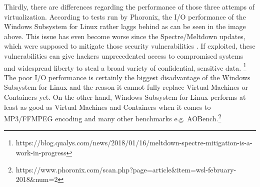 \documentclass[utf8,biblatex]{lni}
\begin{document}
Thirdly, there are differences regarding the performance of those three attemps of virtualization. According to tests run by Phoronix, the I/O performance of the Windows Subsystem for Linux rather laggs behind as can be seen in the image above. This issue has even become worse since the Spectre/Meltdown updates, which were supposed to mitigate those security vulnerabilities . \glqq If exploited, these vulnerabilities can give hackers unprecedented access to compromised systems and widespread liberty to steal a broad variety of confidential, sensitive data. \glqq \footnote{https://blog.qualys.com/news/2018/01/16/meltdown-spectre-mitigation-is-a-work-in-progress} The poor I/O performance is certainly the biggest disadvantage of the Windows Subsystem for Linux and the reason it cannot fully replace Virtual Machines or Containers yet. On the other hand, Windows Subsystem for Linux performs at least as good as Virtual Machines and Containers when it comes to MP3/FFMPEG encoding and many other benchmarks e.g. AOBench.\footnote{https://www.phoronix.com/scan.php?page=article&item=wsl-february-2018&num=2}

\end{document}
